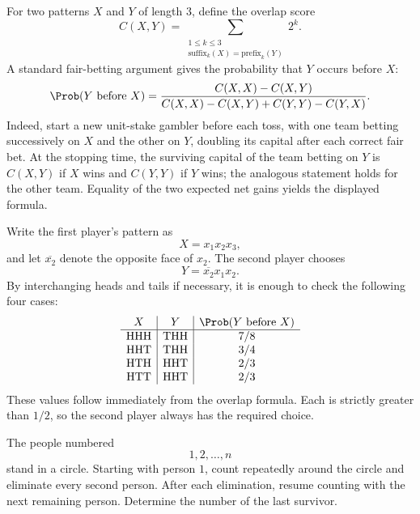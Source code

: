     \begin{solution}
        For two patterns $X$ and $Y$ of length $3$, define the overlap score
        \[
            C(X,Y)
            =
            \sum_{\substack{1\leq k\leq3\\
            \text{suffix}_k(X)=\text{prefix}_k(Y)}}2^k.
        \]
        A standard fair-betting argument gives the probability that $Y$ occurs
        before $X$:
        \[
            \Prob(Y\text{ before }X)
            =
            \frac{C(X,X)-C(X,Y)}
            {C(X,X)-C(X,Y)+C(Y,Y)-C(Y,X)}.
        \]
        Indeed, start a new unit-stake gambler before each toss, with one team
        betting successively on $X$ and the other on $Y$, doubling its capital
        after each correct fair bet. At the stopping time, the surviving
        capital of the team betting on $Y$ is $C(X,Y)$ if $X$ wins and
        $C(Y,Y)$ if $Y$ wins; the analogous statement holds for the other
        team. Equality of the two expected net gains yields the displayed
        formula.

        Write the first player's pattern as
        \[
            X=x_1x_2x_3,
        \]
        and let $\overline{x_2}$ denote the opposite face of $x_2$. The second
        player chooses
        \[
            Y=\overline{x_2}x_1x_2.
        \]
        By interchanging heads and tails if necessary, it is enough to check
        the following four cases:
        \[
            \begin{array}{c|c|c}
                X & Y & \Prob(Y\text{ before }X)\\
                \hline
                \mathrm{HHH} & \mathrm{THH} & 7/8\\
                \mathrm{HHT} & \mathrm{THH} & 3/4\\
                \mathrm{HTH} & \mathrm{HHT} & 2/3\\
                \mathrm{HTT} & \mathrm{HHT} & 2/3
            \end{array}
        \]
        These values follow immediately from the overlap formula. Each is
        strictly greater than $1/2$, so the second player always has the
        required choice.
    \end{solution}

    \begin{expectedproblem}
        The people numbered
        \[
            1,2,\ldots,n
        \]
        stand in a circle. Starting with person $1$, count repeatedly around
        the circle and eliminate every second person. After each elimination,
        resume counting with the next remaining person. Determine the number
        of the last survivor.
    \end{expectedproblem}

